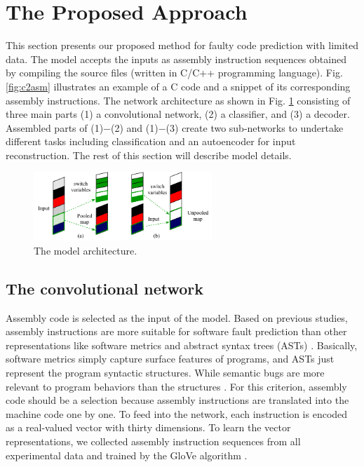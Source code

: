 \section{The Proposed Approach}
\label{sec:proposed_approach}
This section presents our proposed method for faulty code prediction with limited data. The model accepts the inputs as assembly instruction sequences obtained by compiling the source files (written in C/C++ programming language). Fig. \ref{fig:c2asm} illustrates an example of a C code and a snippet of its corresponding assembly instructions. The network architecture as shown in Fig. \ref{fig:model} consisting of three main parts (1) a convolutional network, (2) a classifier, and (3) a decoder. Assembled parts of (1)$-$(2) and (1)$-$(3) create two sub-networks to undertake different tasks including classification and an autoencoder for input reconstruction. The rest of this section will describe model details.
\begin{center}
    \begin{figure}
    \includegraphics[width=0.6\textwidth]{sections/figures/pool_unpool.pdf}
    \caption{The model architecture. }
    \label{fig:model}
    \end{figure}
\end{center}
\subsection{The convolutional network}
Assembly code is selected as the input of the model. Based on previous studies, assembly instructions are more suitable for software fault prediction than other representations like software metrics and abstract syntax trees (ASTs) \cite{phan2017conv_asm}. Basically, software metrics simply capture surface features of programs, and ASTs just represent the program syntactic structures. While semantic bugs are more relevant to program behaviors than the structures \cite{viet2019transfer}. For this criterion, assembly code should be a selection because assembly instructions are translated into the machine code one by one. To feed into the network, each instruction is encoded as a real-valued vector with thirty dimensions. To learn the vector representations, we collected assembly instruction sequences from all experimental data and trained by the GloVe algorithm \cite{pennington2014glove}.   

